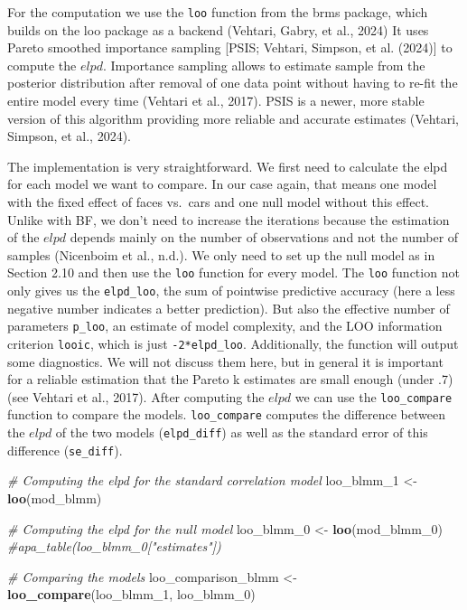 \documentclass[
  doc,12pt,floatsintext]{apa7}
\newenvironment{Shaded}{\begin{snugshade}}{\end{snugshade}}
\newcommand{\CommentTok}[1]{\textcolor[rgb]{0.56,0.35,0.01}{\textit{#1}}}
\newcommand{\FunctionTok}[1]{\textcolor[rgb]{0.13,0.29,0.53}{\textbf{#1}}}
\newcommand{\NormalTok}[1]{#1}
\newcommand{\OtherTok}[1]{\textcolor[rgb]{0.56,0.35,0.01}{#1}}
\begin{document}
For the computation we use the \texttt{loo} function from the brms package, which builds on the loo package as a backend (Vehtari, Gabry, et al., 2024) It uses Pareto smoothed importance sampling {[}PSIS; Vehtari, Simpson, et al. (2024){]} to compute the \(elpd\). Importance sampling allows to estimate sample from the posterior distribution after removal of one data point without having to re-fit the entire model every time (Vehtari et al., 2017). PSIS is a newer, more stable version of this algorithm providing more reliable and accurate estimates (Vehtari, Simpson, et al., 2024).

The implementation is very straightforward. We first need to calculate the elpd for each model we want to compare. In our case again, that means one model with the fixed effect of faces vs.~cars and one null model without this effect. Unlike with BF, we don't need to increase the iterations because the estimation of the \(elpd\) depends mainly on the number of observations and not the number of samples (Nicenboim et al., n.d.). We only need to set up the null model as in Section 2.10 and then use the \texttt{loo} function for every model. The \texttt{loo} function not only gives us the \texttt{elpd\_loo}, the sum of pointwise predictive accuracy (here a less negative number indicates a better prediction). But also the effective number of parameters \texttt{p\_loo}, an estimate of model complexity, and the LOO information criterion \texttt{looic}, which is just \texttt{-2*elpd\_loo}. Additionally, the function will output some diagnostics. We will not discuss them here, but in general it is important for a reliable estimation that the Pareto k estimates are small enough (under .7) (see Vehtari et al., 2017). After computing the \(elpd\) we can use the \texttt{loo\_compare} function to compare the models. \texttt{loo\_compare} computes the difference between the \(elpd\) of the two models (\texttt{elpd\_diff}) as well as the standard error of this difference (\texttt{se\_diff}).

\begin{Shaded}
\begin{Highlighting}[]
\CommentTok{\# Computing the elpd for the standard correlation model}
\NormalTok{loo\_blmm\_1 }\OtherTok{\textless{}{-}} \FunctionTok{loo}\NormalTok{(mod\_blmm)}

\CommentTok{\# Computing the elpd for the null model}
\NormalTok{loo\_blmm\_0 }\OtherTok{\textless{}{-}} \FunctionTok{loo}\NormalTok{(mod\_blmm\_0)}
\CommentTok{\#apa\_table(loo\_blmm\_0["estimates"])}

\CommentTok{\# Comparing the models}
\NormalTok{loo\_comparison\_blmm }\OtherTok{\textless{}{-}} \FunctionTok{loo\_compare}\NormalTok{(loo\_blmm\_1, loo\_blmm\_0)}
\end{Highlighting}
\end{Shaded}
\end{document}
